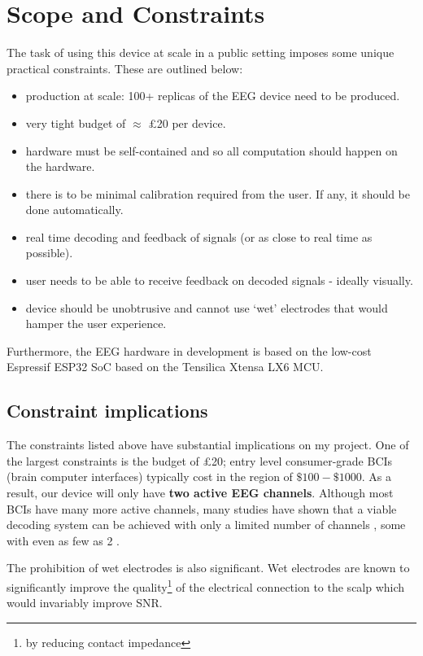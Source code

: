 \section{Scope and Constraints}
The task of using this device at scale in a public setting imposes some unique practical constraints. These are outlined below:
\begin{itemize}
    \item production at scale: 100+ replicas of the EEG device need to be produced.
    \item very tight budget of $\approx$ £20 per device.
    \item hardware must be self-contained and so all computation should happen on the hardware. 
    \item there is to be minimal calibration required from the user. If any, it should be done automatically.
    \item real time decoding and feedback of signals (or as close to real time as possible).
    \item user needs to be able to receive feedback on decoded signals - ideally visually.
    \item device should be unobtrusive and cannot use `wet' electrodes that would hamper the user experience.
\end{itemize}

Furthermore, the EEG hardware in development is based on the low-cost Espressif ESP32 SoC based on the Tensilica Xtensa LX6 MCU. 

\subsection{Constraint implications}
The constraints listed above have substantial implications on my project. One of the largest constraints is the budget of £20; entry level consumer-grade BCIs (brain computer interfaces) typically cost in the region of $\$100-\$1000$. As a result, our device will only have \textbf{two active EEG channels}. Although most BCIs have many more active channels, many studies have shown that a viable decoding system can be achieved with only a limited number of channels \cite{Wang2011}, some with even as few as 2 \cite{Acampora2021}. 

The prohibition of wet electrodes is also significant. Wet electrodes are known to significantly improve the quality\footnote{by reducing contact impedance} of the electrical connection to the scalp which would invariably improve SNR. 

